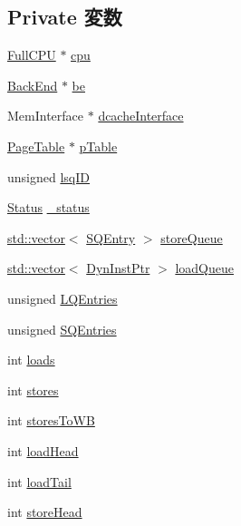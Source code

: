 \subsection*{Private 変数}
\begin{DoxyCompactItemize}
\item 
\hyperlink{classOzoneLSQ_a90ba84e54618cc07f2e8f05e046cb5ce}{FullCPU} $\ast$ \hyperlink{classOzoneLSQ_a766385c2941cd46525f4d9dff90200a2}{cpu}
\item 
\hyperlink{classBackEnd}{BackEnd} $\ast$ \hyperlink{classOzoneLSQ_a84f815aa1fa864ba2e6d75f5ad2b52d1}{be}
\item 
MemInterface $\ast$ \hyperlink{classOzoneLSQ_a22dc8294eecb144fbdd951d2e32e9330}{dcacheInterface}
\item 
\hyperlink{classPageTable}{PageTable} $\ast$ \hyperlink{classOzoneLSQ_ad14ffa23ad731f6003755b643f999049}{pTable}
\item 
unsigned \hyperlink{classOzoneLSQ_adfd96fbbaa327a31d20f0d4134418fad}{lsqID}
\item 
\hyperlink{classOzoneLSQ_a67a0db04d321a74b7e7fcfd3f1a3f70b}{Status} \hyperlink{classOzoneLSQ_a6cdf6e6db875a442f3ab6db542bd2bb5}{\_\-status}
\item 
\hyperlink{classstd_1_1vector}{std::vector}$<$ \hyperlink{structOzoneLSQ_1_1SQEntry}{SQEntry} $>$ \hyperlink{classOzoneLSQ_a1d370cdc36d253e0f786d46c6af77a40}{storeQueue}
\item 
\hyperlink{classstd_1_1vector}{std::vector}$<$ \hyperlink{classOzoneLSQ_a028ce10889c5f6450239d9e9a7347976}{DynInstPtr} $>$ \hyperlink{classOzoneLSQ_aa5f3703c5d7c5ce21a497352b94c7465}{loadQueue}
\item 
unsigned \hyperlink{classOzoneLSQ_aafa99d800d574095881acbacdbbbcc47}{LQEntries}
\item 
unsigned \hyperlink{classOzoneLSQ_a38c8af5392da70119dc5cce4e3637cbc}{SQEntries}
\item 
int \hyperlink{classOzoneLSQ_a867971f18e464abd16193e069c64a8ad}{loads}
\item 
int \hyperlink{classOzoneLSQ_ade9e895aa9c5ace27779c985c4f43326}{stores}
\item 
int \hyperlink{classOzoneLSQ_a3831a7965ffbe90df177026988476f9c}{storesToWB}
\item 
int \hyperlink{classOzoneLSQ_ac09af89928d2ef4da4cbdcfce26fa3f5}{loadHead}
\item 
int \hyperlink{classOzoneLSQ_a973a489225da164cc85e690f13c86841}{loadTail}
\item 
int \hyperlink{classOzoneLSQ_a6e87b6f77102183080ea6ab8599b26a9}{storeHead}

\end{DoxyCompactItemize}
